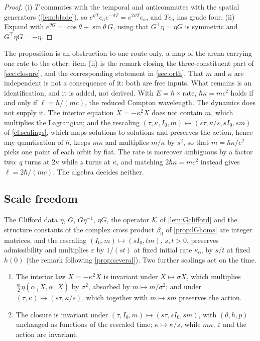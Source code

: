 \begin{proof}
(i) $T$ commutes with the temporal and anticommutes with the spatial generators (\cref{lem:blade}), so $e^{\vartheta T}e_ae^{-\vartheta T}=e^{2\vartheta T}e_a$,
and $Te_a$ has grade four. (ii) Expand with $e^{\theta G}=\cos\theta+\sin\theta\,G$, using that $G^{\!\top}\eta=\eta G$ is symmetric and
$G^{\!\top}\eta G=-\eta$.
\end{proof}

The proposition is an obstruction to one route only, a map of the arena carrying one rate to the other; item (ii) is the remark closing the
three-constituent part of \cref{sec:closure}, and the corresponding statement in \cref{sec:orth}. That $m$ and $\kappa$ are independent is
not a consequence of it: both are free inputs. What remains is an identification, and it is added, not derived. With $E=\hbar\times$rate,
$\hbar\kappa=mc^2$ holds if and only if $\ell=\hbar/(mc)$, the reduced Compton wavelength. The dynamics does not supply it. The interior equation
$\ddot X=-\kappa^2X$ does not contain $m$, which multiplies the Lagrangian; and the rescaling $(\tau,\kappa,I_0,m)\mapsto(s\tau,\kappa/s,sI_0,sm)$ of
\cref{cl:scalings}, which maps solutions to solutions and preserves the action, hence any quantisation of $h$, keeps $m\kappa$ and multiplies
$m/\kappa$ by $s^2$, so that $m=\hbar\kappa/c^2$ picks one point of each orbit by fiat. The rate is moreover ambiguous by a factor two: $q$ turns at
$2\kappa$ while $z$ turns at $\kappa$, and matching $2\hbar\kappa=mc^2$ instead gives $\ell=2\hbar/(mc)$. The algebra decides neither.

\subsection{Scale freedom}
\label{sec:restscale}

The Clifford data $\eta$, $G$, $G\eta^{-1}$, $\eta G$, the operator $\mathcal K$ of \cref{lem:Gclifford} and the structure constants of the complex cross
product $\beta_0$ of \cref{prop:lGhoms} are integer matrices, and the rescaling $(I_0,m)\mapsto(sI_0,tm)$, $s,t>0$, preserves admissibility and
multiplies $\varepsilon$ by $1/(st)$ at fixed initial rate $\kappa_0$, by $s/t$ at fixed $h(0)$ (the remark following \cref{prop:several}). Two
further scalings act on the time.

\begin{proposition}[Scalings]
\label{cl:scalings}
\begin{enumerate}[label=(\roman*),leftmargin=2.2em]
\item The interior law $\ddot X=-\kappa^2X$ is invariant under $X\mapsto\sigma X$, which multiplies $\tfrac m2\eta(\alpha_+X,\alpha_+X)$ by
$\sigma^2$, absorbed by $m\mapsto m/\sigma^2$; and under $(\tau,\kappa)\mapsto(s\tau,\kappa/s)$, which together with $m\mapsto sm$ preserves the
action.
\item The closure is invariant under $(\tau,I_0,m)\mapsto(s\tau,sI_0,sm)$, with $(\theta,h,p)$ unchanged as functions of the rescaled time;
$\kappa\mapsto\kappa/s$, while $m\kappa$, $\varepsilon$ and the action are invariant.
\end{enumerate}
\end{proposition}

